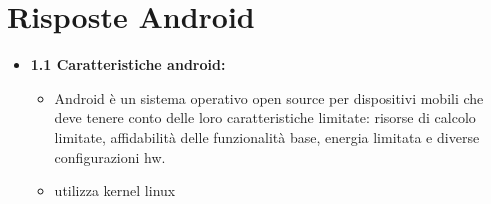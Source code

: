 \documentclass{report}
\begin{document}
\section{Risposte Android}
\begin{itemize}

\item \textbf{1.1 Caratteristiche android:}
\begin{itemize}
    \item Android \`e un sistema operativo open source per dispositivi mobili che deve tenere conto delle loro caratteristiche limitate: risorse di calcolo limitate, affidabilit\`a delle funzionalit\`a base, energia limitata e diverse configurazioni hw.
    \item utilizza kernel linux
\end{itemize}


\end{itemize}
\end{document}
